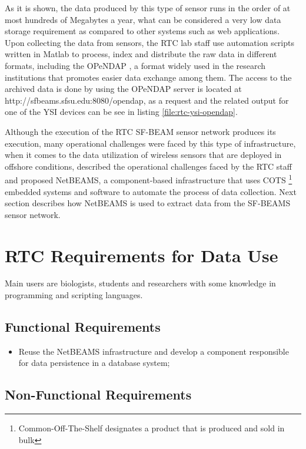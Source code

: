 As it is shown, the data produced by this type of sensor runs in the order of
at most hundreds of Megabytes a year, what can be considered a very low data
storage requirement as compared to other systems such as web applications. Upon
collecting the data from sensors, the RTC lab staff use automation scripts
written in Matlab to process, index and distribute the raw data in different
formats, including the OPeNDAP \cite{opendap}, a format widely used in the
research institutions that promotes easier data exchange among them. The
access to the archived data is done by using the OPeNDAP server is located at
http://sfbeams.sfsu.edu:8080/opendap, as a request and the related output for
one of the YSI devices can be see in listing \ref{file:rtc-ysi-opendap}.

Although the execution of the RTC SF-BEAM sensor network produces its
execution, many operational challenges were faced by this type of
infrastructure, when it comes to the data utilization of wireless sensors that
are deployed in offshore conditions, \cite{netbeams2009} described the
operational challenges faced by the RTC staff and proposed NetBEAMS, a
component-based infrastructure that uses COTS \footnote{Common-Off-The-Shelf
designates a product that is produced and sold in bulk} embedded systems and
software to automate the process of data collection. Next section describes
how NetBEAMS is used to extract data from the SF-BEAMS sensor network.

\section{RTC Requirements for Data Use}
\label{sec:problem-requirements}

Main users are biologists, students and researchers with some knowledge in
programming and scripting languages. 

\subsection{Functional Requirements}

\begin{itemize}
  \item Reuse the NetBEAMS infrastructure and develop a component responsible
  for data persistence in a database system;
\end{itemize}

\subsection{Non-Functional Requirements}


